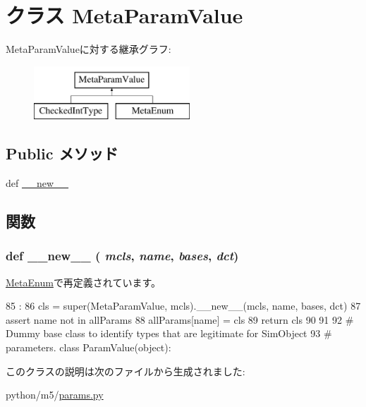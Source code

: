 \hypertarget{classm5_1_1params_1_1MetaParamValue}{
\section{クラス MetaParamValue}
\label{classm5_1_1params_1_1MetaParamValue}
}
MetaParamValueに対する継承グラフ:\begin{figure}[H]
\begin{center}
\leavevmode
\includegraphics[height=2cm]{classm5_1_1params_1_1MetaParamValue}
\end{center}
\end{figure}
\subsection*{Public メソッド}
\begin{DoxyCompactItemize}
\item 
def \hyperlink{classm5_1_1params_1_1MetaParamValue_a2f15a4676204349e06bcced484b06b70}{\_\-\_\-new\_\-\_\-}
\end{DoxyCompactItemize}


\subsection{関数}
\hypertarget{classm5_1_1params_1_1MetaParamValue_a2f15a4676204349e06bcced484b06b70}{
\subsubsection[{\_\-\_\-new\_\-\_\-}]{\setlength{\rightskip}{0pt plus 5cm}def \_\-\_\-new\_\-\_\- ( {\em mcls}, \/   {\em name}, \/   {\em bases}, \/   {\em dct})}}
\label{classm5_1_1params_1_1MetaParamValue_a2f15a4676204349e06bcced484b06b70}


\hyperlink{classm5_1_1params_1_1MetaEnum_a2f15a4676204349e06bcced484b06b70}{MetaEnum}で再定義されています。


\begin{DoxyCode}
85                                        :
86         cls = super(MetaParamValue, mcls).__new__(mcls, name, bases, dct)
87         assert name not in allParams
88         allParams[name] = cls
89         return cls
90 
91 
92 # Dummy base class to identify types that are legitimate for SimObject
93 # parameters.
class ParamValue(object):
\end{DoxyCode}


このクラスの説明は次のファイルから生成されました:\begin{DoxyCompactItemize}
\item 
python/m5/\hyperlink{params_8py}{params.py}\end{DoxyCompactItemize}
